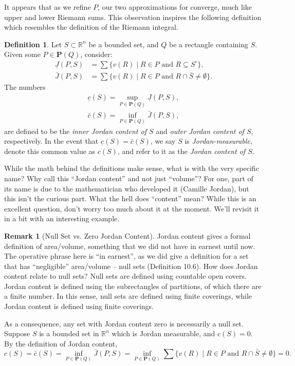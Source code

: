 \documentclass{article}
\newcommand{\R}{\mathbb{R}}
\theoremstyle{definition}
\newtheorem{definition}{Definition}[section]
\newtheorem{remark}{Remark}[section]
\begin{document}
	It appears that as we refine $ P $, our two approximations for converge, much like upper and lower Riemann sums. This observation inspires the following definition which resembles the definition of the Riemann integral.
	
	\begin{definition}
		Let $ S\subset \R^n $ be a bounded set, and $ Q $ be a rectangle containing $ S $. Given some $ P\in \mathbf P(Q) $, consider:
		\begin{align*}
			\underline J(P,S) &= \sum\{v(R)\mid R\in P\text{ and }R\subseteq S^\circ\},\\
			\bar J(P,S) & = \sum\{v(R)\mid R\in P\text{ and }R\cap \bar S\neq \emptyset\}.
		\end{align*}
	The numbers 
	\begin{align*}
		\underline c(S) = \sup_{P\in \textbf{P}(Q)} \underline{J}(P,S),\\ 
		\bar c(S) = \inf_{P\in \textbf{P}(Q)} \bar {J}(P,S),
	\end{align*}
	are defined to be the  \textit{\color{red}inner Jordan content of $ S $} and \textit{\color{red}outer Jordan content of $ S $}, respectively. In the event that $  \underline c(S) = \bar c(S)$, we say $ S $ is \textit{\color{red}Jordan-measurable},  denote this common value as $ c(S) $, and refer to it as the \textit{\color{red}Jordan content of $ S $}.
	\end{definition}
	While the math behind the definitions make sense, what is with the very specific name? Why call this ``Jordan content'' and not just ``volume''? For one, part of its name is due to the mathematician who developed it (Camille Jordan), but this isn't the curious part. What the hell does ``content'' mean? While this is an excellent question, don't worry too much about it at the moment. We'll revisit it in a bit with an interesting example. 
	
	\begin{remark}[Null Set vs. Zero Jordan Content]
		Jordan content gives a formal definition of area/volume, something that we did not have in earnest until now. The operative phrase here is ``in earnest'', as we did give a definition for a set that has ``negligible'' area/volume -- null sets (Definition 10.6). How does Jordan content relate to null sets? Null sets are defined using countable open covers. Jordan content is defined using the subrectangles of partitions, of which there are a finite number. In this sense, null sets are defined using finite coverings, while Jordan content is defined using finite coverings. 
		
		As a consequence, any set with Jordan content zero is necessarily a null set.  Suppose $ S $ is a bounded set in $ \R^n $ which is Jordan measurable, and $ c(S) = 0 $. By the definition of Jordan content, 
		$$	c(S) = \bar c(S) = \inf_{P\in \textbf{P}(Q)}\bar J(P,S)  = \inf_{P\in \textbf{P}(Q)}\sum\{v(R)\mid R\in P\text{ and }R\cap \bar S\neq \emptyset\} = 0.$$
	\end{remark}
	
\end{document}
